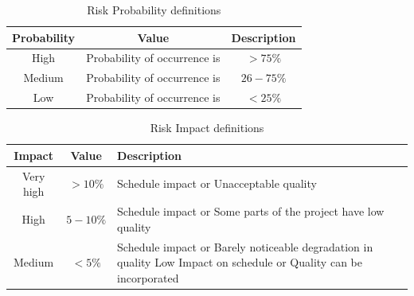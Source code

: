 \documentclass[oneside,a4paper,12pt]{report}
\begin{document}
\begin{table}[!htbp]
\begin{center}
\def\arraystretch{1.5}
\begin{tabular}{| c | c | c |}
\hline
Probability & Value &	Description \\ \hline
High &	Probability of occurrence is &  $ > 75 \% $ \\ \hline
Medium &	Probability of occurrence is  & $26-75 \% $ \\ \hline
Low	& Probability of occurrence is & $ < 25 \% $ \\ \hline
\end{tabular}
\end{center}
\caption{Risk Probability definitions \cite{bookPressman}}
\label{tab:riskdef}
\end{table}

\begin{table}[!htbp]
\begin{center}
\def\arraystretch{1.5}
\begin{tabularx}{\textwidth}{| c | c | X |}
\hline
Impact & Value	& Description \\ \hline
Very high &	$> 10 \%$ & Schedule impact or Unacceptable quality \\ \hline
High &	$5-10 \%$ & Schedule impact or Some parts of the project have low quality \\ \hline
Medium	& $ < 5 \% $ & Schedule impact or Barely noticeable degradation in quality Low	Impact on schedule or Quality can be incorporated \\ \hline
\end{tabularx}
\end{center}
\caption{Risk Impact definitions \cite{bookPressman}}
\label{tab:riskImpactDef}
\end{table}
\end{document}
